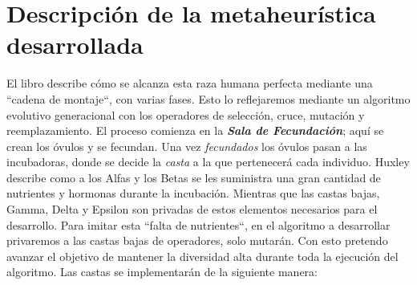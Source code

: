 \section{Descripción de la metaheurística desarrollada} \label{sect: description}

El libro describe cómo se alcanza esta raza humana perfecta mediante una ``cadena de montaje``, con varias fases. Esto lo 
reflejaremos mediante un algoritmo evolutivo generacional con los operadores de selección, cruce, mutación y reemplazamiento. 
El proceso comienza en la \textbf{\textit{Sala de Fecundación}}; aquí se crean los óvulos y se fecundan. Una vez \textit{fecundados}
los óvulos pasan a las incubadoras, donde se decide la \textit{casta} a la que pertenecerá cada individuo. Huxley describe 
como a los Alfas y los Betas se les suministra una gran cantidad de nutrientes y hormonas durante la incubación. Mientras que las
castas bajas, Gamma, Delta y Epsilon son privadas de estos elementos necesarios para el desarrollo. Para imitar esta
 ``falta de nutrientes``, en el algoritmo a desarrollar privaremos a las castas bajas de operadores, solo mutarán. Con esto
 pretendo avanzar el objetivo de mantener la diversidad alta durante toda la ejecución del algoritmo. 
 Las castas se implementarán de la siguiente manera: 


